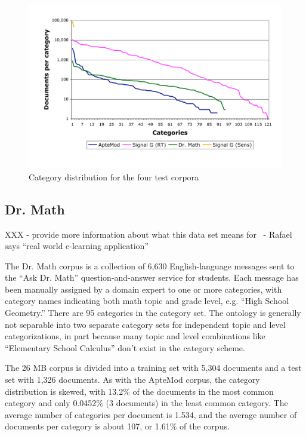 \begin{figure}
\begin{center}
\includegraphics[width=\linewidth]{figures/Corpora-catdist.pdf}
\caption{Category distribution for the four test corpora}
\label{Corpora-catdist}
\end{center}
\end{figure}


\subsection{Dr. Math}

XXX - provide more information about what this data set means for
\aicat\ - Rafael says ``real world e-learning application''

The Dr. Math corpus is a collection of 6,630 English-language messages
sent to the ``Ask Dr. Math'' question-and-answer service for
students. \cite{drmath} Each message has been manually assigned by a
domain expert to one or more categories,
with category names indicating both math topic and grade level,
e.g. ``High School Geometry.''  There are 95 categories in the
category set.  The ontology is generally not
separable into two separate category sets for independent topic and
level categorizations, in part because many topic and level
combinations like ``Elementary School Calculus'' don't exist in the
category scheme.

The 26 MB corpus is divided into a training set with 5,304 documents
and a test set with 1,326 documents.  As with the ApteMod corpus, the
category distribution is skewed, with 13.2\% of the documents in the
most common category and only 0.0452\% (3 documents) in the least
common category.  The average number of categories per document is
1.534, and the average number of documents per category is about 107,
or 1.61\% of the corpus.

